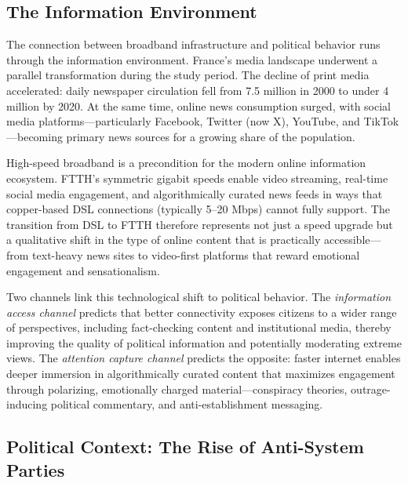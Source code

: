 \documentclass[12pt]{article}
\begin{document}
\subsection{The Information Environment}

The connection between broadband infrastructure and political behavior runs through the information environment. France's media landscape underwent a parallel transformation during the study period. The decline of print media accelerated: daily newspaper circulation fell from 7.5 million in 2000 to under 4 million by 2020. At the same time, online news consumption surged, with social media platforms---particularly Facebook, Twitter (now X), YouTube, and TikTok---becoming primary news sources for a growing share of the population.

High-speed broadband is a precondition for the modern online information ecosystem. FTTH's symmetric gigabit speeds enable video streaming, real-time social media engagement, and algorithmically curated news feeds in ways that copper-based DSL connections (typically 5--20 Mbps) cannot fully support. The transition from DSL to FTTH therefore represents not just a speed upgrade but a qualitative shift in the type of online content that is practically accessible---from text-heavy news sites to video-first platforms that reward emotional engagement and sensationalism.

Two channels link this technological shift to political behavior. The \emph{information access channel} predicts that better connectivity exposes citizens to a wider range of perspectives, including fact-checking content and institutional media, thereby improving the quality of political information and potentially moderating extreme views. The \emph{attention capture channel} predicts the opposite: faster internet enables deeper immersion in algorithmically curated content that maximizes engagement through polarizing, emotionally charged material---conspiracy theories, outrage-inducing political commentary, and anti-establishment messaging.

\subsection{Political Context: The Rise of Anti-System Parties}
\end{document}
